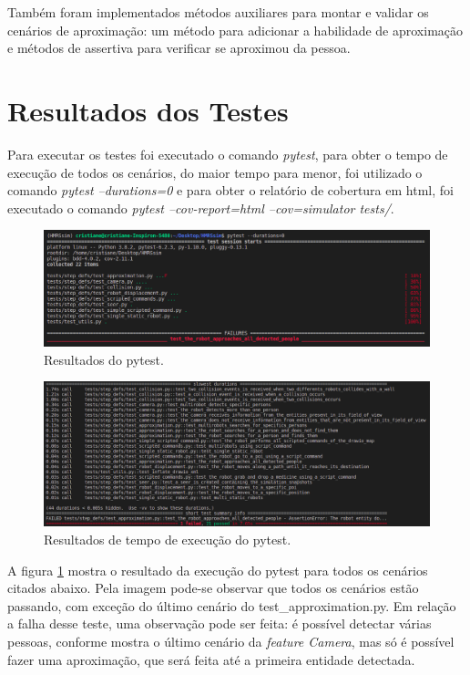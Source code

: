 Também foram implementados métodos auxiliares para montar e validar os cenários de aproximação: um método para adicionar a  habilidade de aproximação e métodos de assertiva para verificar se aproximou da pessoa.

\section{Resultados dos Testes}
\label{sec:testResults}
Para executar os testes foi executado o comando \textit{pytest}, para obter o tempo de execução de todos os cenários, do maior tempo para menor, foi utilizado o comando \textit{pytest --durations=0} e para obter o relatório de cobertura em html, foi executado o comando \textit{pytest --cov-report=html --cov=simulator tests/}.

\begin{figure}
\centering
\includegraphics[width=\textwidth]{imagens/testResults.png}
\caption{Resultados do pytest.} 
\label{fig:testResults}
\end{figure}

\begin{figure}
\centering
\includegraphics[width=\textwidth]{imagens/timeResults.png}
\caption{Resultados de tempo de execução do pytest.} 
\label{fig:timeResults}
\end{figure}

A figura \ref{fig:testResults} mostra o resultado da execução do pytest para todos os cenários citados abaixo. Pela imagem pode-se observar que todos os cenários estão passando, com exceção do último cenário do test\_approximation.py. Em relação a falha desse teste, uma observação pode ser feita: é possível detectar várias pessoas, conforme mostra o último cenário da \textit{feature Camera}, mas só é possível fazer uma aproximação, que será feita até a primeira entidade detectada.

